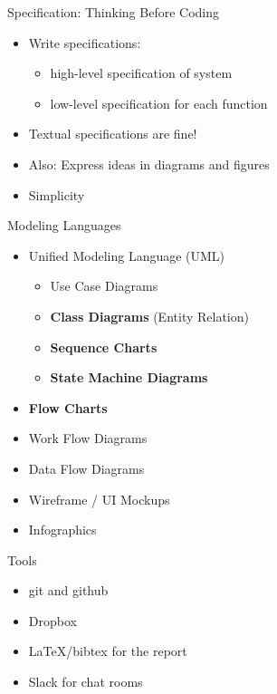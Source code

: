 \documentclass[hyperref={pdfpagelabels=false}, aspectratio=1610]{beamer}
\begin{document}
\begin{frame}
\begin{block}{Specification: Thinking Before Coding}
 \begin{itemize}
  \item Write specifications:
  \begin{itemize}
  	\item high-level specification of system
	\item low-level specification for each function
  \end{itemize}
  \item Textual specifications are fine!
  \item Also: Express ideas in diagrams and figures
  \item Simplicity
 \end{itemize}
\end{block}
\end{frame}

\begin{frame}
\begin{block}{Modeling Languages}
 \begin{itemize}
  \item Unified Modeling Language (UML)
  \begin{itemize}
	\item Use Case Diagrams
  	\item \textbf{Class Diagrams} (Entity Relation)
	\item \textbf{Sequence Charts}
	\item \textbf{State Machine Diagrams}
  \end{itemize}
  \item \textbf{Flow Charts}
  \item Work Flow Diagrams
  \item Data Flow Diagrams
  \item Wireframe / UI Mockups
  \item Infographics
 \end{itemize}
\end{block}
\end{frame}

\begin{frame}
\begin{block}{Tools}
 \begin{itemize}
  \item git and github
  \item Dropbox
  \item LaTeX/bibtex for the report
  \item Slack for chat rooms
 \end{itemize}
\end{block}
\end{frame}
\end{document}
